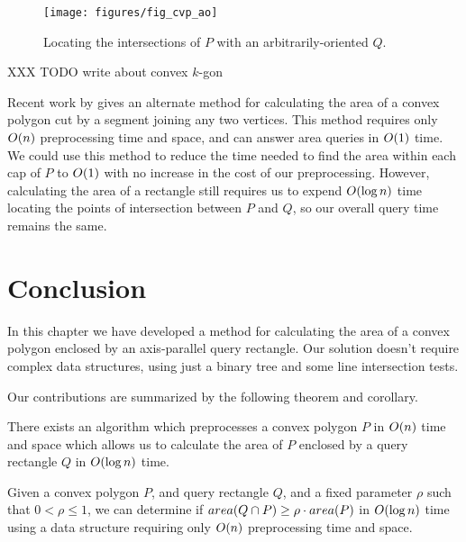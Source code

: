 \begin{figure}
\begin{center}
  \texttt{[image: figures/fig\_cvp\_ao]}
  \caption{Locating the intersections of $P$ with an arbitrarily-oriented $Q$.}
  \label{fig:convexp:ao}
\end{center}
\end{figure}

XXX TODO write about convex $k$-gon

Recent work by \cite{XXX} gives an alternate method for calculating the area of a convex polygon cut by a segment joining any two vertices.  This method requires only $O\!\left(n\right)$ preprocessing time and space, and can answer area queries in $O\!\left(1\right)$ time. We could use this method to reduce the time needed to find the area within each cap of $P$ to $O\!\left(1\right)$ with no increase in the cost of our preprocessing. However, calculating the area of a rectangle still requires us to expend $O\!\left(\log{n}\right)$ time locating the points of intersection between $P$ and $Q$, so our overall query time remains the same.


\section{Conclusion}
\label{:convexp:concl}

In this chapter we have developed a method for calculating the area of a convex polygon enclosed by an axis-parallel query rectangle. Our solution doesn't require complex data structures, using just a binary tree and some line intersection tests.

Our contributions are summarized by the following theorem and corollary.

\begin{theorem}
\label{th:convexp:area}
There exists an algorithm which preprocesses a convex polygon $P$ in $O\!\left(n\right)$ time and space which allows us to calculate the area of $P$ enclosed by a query rectangle $Q$ in $O\!\left(\log{n}\right)$ time.
\end{theorem}

\begin{corollary}
\label{cor:convexp:mp}
Given a convex polygon $P$, and query rectangle $Q$, and a fixed parameter $\rho$ such that $0 < \rho \leq 1$, we can determine if $area(Q \cap P) \geq \rho \cdot area(P)$ in $O\!\left(\log{n}\right)$ time using a data structure requiring only $O\!\left(n\right)$ preprocessing time and space.
\end{corollary}
